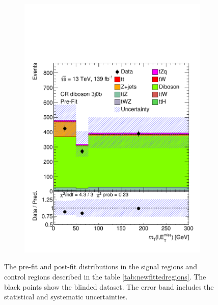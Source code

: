 \begin{figure}[!h]
\begin{subfigure}[b]{0.33\linewidth}
    \includegraphics[width=\textwidth]{ubonn-thesis/Chapters/Chapters_08/appendix/data/CR_3j0b.pdf} 
  \end{subfigure} 
  \caption{ The pre-fit and post-fit distributions in the signal regions and control regions described in the table \ref{tab:newfittedregions}. The black points show the blinded dataset. The error band includes the statistical and systematic uncertainties.}
  \label{fig:newfit1}
\end{figure}

